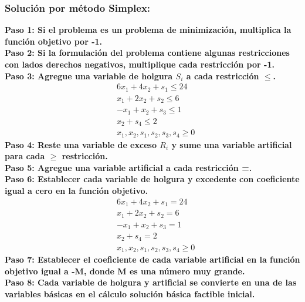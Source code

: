 \documentclass{templateNote}
\begin{document}
\subsubsection*{Solución por método Simplex:}
\noindent
\textbf{Paso 1: Si el problema es un problema de minimización, multiplica la función objetivo por -1.}
\\
\textbf{Paso 2: Si la formulación del problema contiene algunas restricciones con lados derechos negativos, multiplique cada restricción por -1.}
\\
\textbf{Paso 3: Agregue una variable de holgura $S_i$ a cada restricción $\leq$.}
\begin{equation*}
    \begin{aligned}
        & 6x_1 + 4x_2 + s_1 \leq 24 \\
        & x_1 + 2x_2 + s_2 \leq 6 \\
        & -x_1 + x_2 + s_3 \leq 1 \\
        & x_2 + s_4 \leq 2 \\
        & x_1, x_2, s_1, s_2, s_3, s_4 \geq 0
    \end{aligned}
\end{equation*}
\textbf{Paso 4: Reste una variable de exceso $R_i$ y sume una variable artificial para cada $\geq$ restricción.}
\\
\textbf{Paso 5: Agregue una variable artificial a cada restricción =.}
\\
\textbf{Paso 6: Establecer cada variable de holgura y excedente con coeficiente igual a cero en la función objetivo.}
\begin{equation*}
    \begin{aligned}
        & 6x_1 + 4x_2 + s_1 = 24 \\
        & x_1 + 2x_2 + s_2 = 6 \\
        & -x_1 + x_2 + s_3 = 1 \\
        & x_2 + s_4 = 2 \\
        & x_1, x_2, s_1, s_2, s_3, s_4 \geq 0
    \end{aligned}
\end{equation*}
\textbf{Paso 7: Establecer el coeficiente de cada variable artificial en la función objetivo igual a -M, donde M es una número muy grande.}
\\
\textbf{Paso 8: Cada variable de holgura y  artificial se convierte en una de las variables básicas en el cálculo solución básica factible inicial.}
\end{document}
